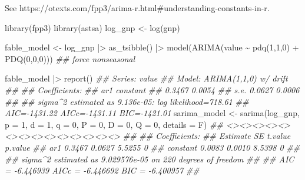 \documentclass[
  letterpaper,
  DIV=11,
  numbers=noendperiod]{scrartcl}
\newenvironment{Shaded}{\begin{snugshade}}{\end{snugshade}}
\newcommand{\AttributeTok}[1]{\textcolor[rgb]{0.40,0.45,0.13}{#1}}
\newcommand{\DecValTok}[1]{\textcolor[rgb]{0.68,0.00,0.00}{#1}}
\newcommand{\DocumentationTok}[1]{\textcolor[rgb]{0.37,0.37,0.37}{\textit{#1}}}
\newcommand{\FunctionTok}[1]{\textcolor[rgb]{0.28,0.35,0.67}{#1}}
\newcommand{\NormalTok}[1]{\textcolor[rgb]{0.00,0.23,0.31}{#1}}
\newcommand{\OtherTok}[1]{\textcolor[rgb]{0.00,0.23,0.31}{#1}}
\newcommand{\SpecialCharTok}[1]{\textcolor[rgb]{0.37,0.37,0.37}{#1}}
\begin{document}
See https://otexts.com/fpp3/arima-r.html\#understanding-constants-in-r.

\begin{Shaded}
\begin{Highlighting}[]
\FunctionTok{library}\NormalTok{(fpp3)}
\FunctionTok{library}\NormalTok{(astsa)}
\NormalTok{log\_gnp }\OtherTok{\textless{}{-}} \FunctionTok{log}\NormalTok{(gnp)}

\NormalTok{fable\_model }\OtherTok{\textless{}{-}}\NormalTok{ log\_gnp }\SpecialCharTok{|\textgreater{}} 
  \FunctionTok{as\_tsibble}\NormalTok{() }\SpecialCharTok{|\textgreater{}}
  \FunctionTok{model}\NormalTok{(}\FunctionTok{ARIMA}\NormalTok{(value }\SpecialCharTok{\textasciitilde{}} \FunctionTok{pdq}\NormalTok{(}\DecValTok{1}\NormalTok{,}\DecValTok{1}\NormalTok{,}\DecValTok{0}\NormalTok{) }\SpecialCharTok{+} \FunctionTok{PDQ}\NormalTok{(}\DecValTok{0}\NormalTok{,}\DecValTok{0}\NormalTok{,}\DecValTok{0}\NormalTok{))) }\DocumentationTok{\#\# force nonseasonal}

\NormalTok{fable\_model }\SpecialCharTok{|\textgreater{}} \FunctionTok{report}\NormalTok{()}
\DocumentationTok{\#\# Series: value }
\DocumentationTok{\#\# Model: ARIMA(1,1,0) w/ drift }
\DocumentationTok{\#\# }
\DocumentationTok{\#\# Coefficients:}
\DocumentationTok{\#\#          ar1  constant}
\DocumentationTok{\#\#       0.3467    0.0054}
\DocumentationTok{\#\# s.e.  0.0627    0.0006}
\DocumentationTok{\#\# }
\DocumentationTok{\#\# sigma\^{}2 estimated as 9.136e{-}05:  log likelihood=718.61}
\DocumentationTok{\#\# AIC={-}1431.22   AICc={-}1431.11   BIC={-}1421.01}
\NormalTok{sarima\_model }\OtherTok{\textless{}{-}} \FunctionTok{sarima}\NormalTok{(log\_gnp, }\AttributeTok{p =} \DecValTok{1}\NormalTok{, }\AttributeTok{d =} \DecValTok{1}\NormalTok{, }\AttributeTok{q =} \DecValTok{0}\NormalTok{, }\AttributeTok{P =} \DecValTok{0}\NormalTok{, }\AttributeTok{D =} \DecValTok{0}\NormalTok{, }\AttributeTok{Q =} \DecValTok{0}\NormalTok{, }\AttributeTok{details =}\NormalTok{ F)}
\DocumentationTok{\#\# \textless{}\textgreater{}\textless{}\textgreater{}\textless{}\textgreater{}\textless{}\textgreater{}\textless{}\textgreater{}\textless{}\textgreater{}\textless{}\textgreater{}\textless{}\textgreater{}\textless{}\textgreater{}\textless{}\textgreater{}\textless{}\textgreater{}\textless{}\textgreater{}\textless{}\textgreater{}\textless{}\textgreater{}}
\DocumentationTok{\#\#  }
\DocumentationTok{\#\# Coefficients: }
\DocumentationTok{\#\#          Estimate     SE t.value p.value}
\DocumentationTok{\#\# ar1        0.3467 0.0627  5.5255       0}
\DocumentationTok{\#\# constant   0.0083 0.0010  8.5398       0}
\DocumentationTok{\#\# }
\DocumentationTok{\#\# sigma\^{}2 estimated as 9.029576e{-}05 on 220 degrees of freedom }
\DocumentationTok{\#\#  }
\DocumentationTok{\#\# AIC = {-}6.446939  AICc = {-}6.446692  BIC = {-}6.400957 }
\DocumentationTok{\#\# }


\end{Highlighting}
\end{Shaded}
\end{document}
